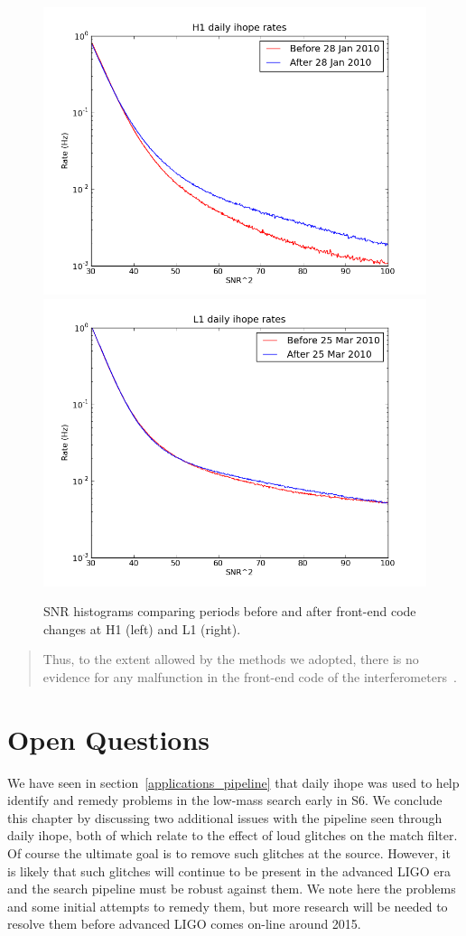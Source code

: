 \begin{figure}
  \includegraphics[width=0.5\linewidth]{figures/detchar/frontendtest_h1_log_2.png}
  \includegraphics[width=0.5\linewidth]{figures/detchar/frontendtest_l1_log_2.png}
  \caption[SNR histograms before and after code changes.] {
  \label{f:code_changes}
SNR histograms comparing periods before and after 
front-end code changes at H1 (left) and L1 (right).}
\end{figure}%


\begin{quote}
  Thus, to the extent allowed by the methods we adopted, there is no
  evidence for any malfunction in the front-end code of the
  interferometers~\cite{Whitcomb:injection}. 
\end{quote}



\section{Open Questions}
\label{sec:daily_ihope_open_questions}

We have seen in section~\ref{applications_pipeline} that daily ihope
was used to help identify and remedy problems in the low-mass search
early in S6.  We conclude this chapter by discussing two additional
issues with the pipeline seen through daily ihope, both of which
relate to the effect of loud glitches on the match filter.  Of course
the ultimate goal is to remove such glitches at the source.  However,
it is likely that such glitches will continue to be present in the
advanced LIGO era and the search pipeline must be robust against them.
We note here the problems and some initial attempts to remedy them,
but more research will be needed to resolve them before advanced LIGO
comes on-line around 2015.


